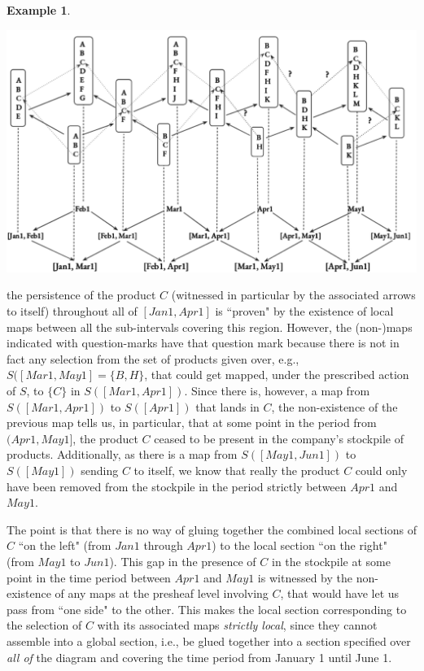 \documentclass[a4paper]{book}
\theoremstyle{definition}
\newtheorem{example}{Example}[section]
\theoremstyle{definition}
\theoremstyle{definition}
\theoremstyle{theorem}
\theoremstyle{definition}
\begin{document}
\begin{example}
	\begin{center}
		\includegraphics*[scale=0.25]{LocalSectionTimeIntervalDiagram.png}
	\end{center}
	the persistence of the product $C$ (witnessed in particular by the associated arrows to itself) throughout all of $[Jan1, Apr1]$ is ``proven" by the existence of local maps between all the sub-intervals covering this region. However, the (non-)maps indicated with question-marks have that question mark because there is not in fact any selection from the set of products given over, e.g., $S([Mar1, May1] = \{B, H\}$, that could get mapped, under the prescribed action of $S$, to $\{C\}$ in $S([Mar1, Apr1])$. Since there is, however, a map from $S([Mar1, Apr1])$ to $S([Apr1])$ that lands in $C$, the non-existence of the previous map tells us, in particular, that at some point in the period from $(Apr1, May1]$, the product $C$ ceased to be present in the company's stockpile of products. Additionally, as there is a map from $S([May1, Jun1])$ to $S([May1])$ sending $C$ to itself, we know that really the product $C$ could only have been removed from the stockpile in the period strictly between $Apr1$ and $May1$. \par 
	The point is that there is no way of gluing together the combined local sections of $C$ ``on the left" (from $Jan1$ through $Apr1$) to the local section ``on the right" (from $May1$ to $Jun1$). This gap in the presence of $C$ in the stockpile at some point in the time period between $Apr1$ and $May1$ is witnessed by the non-existence of any maps at the presheaf level involving $C$, that would have let us pass from ``one side" to the other. This makes the local section corresponding to the selection of $C$ with its associated maps \textit{strictly local}, since they cannot assemble into a global section, i.e., be glued together into a section specified over \textit{all of} the diagram and covering the time period from January 1 until June 1.\par 

\end{example}
\end{document}
